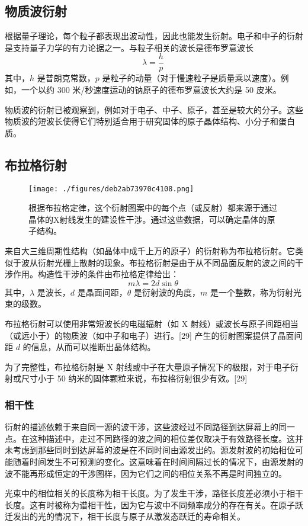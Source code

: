 \subsection{物质波衍射}  
根据量子理论，每个粒子都表现出波动性，因此也能发生衍射。电子和中子的衍射是支持量子力学的有力论据之一。与粒子相关的波长是德布罗意波长  
\[
\lambda = \frac{h}{p}~
\]  
其中，\( h \) 是普朗克常数，\( p \) 是粒子的动量（对于慢速粒子是质量乘以速度）。例如，一个以约 300 米/秒速度运动的钠原子的德布罗意波长大约是 50 皮米。

物质波的衍射已被观察到，例如对于电子、中子、原子，甚至是较大的分子。这些物质波的短波长使得它们特别适合用于研究固体的原子晶体结构、小分子和蛋白质。
\subsection{布拉格衍射}
\begin{figure}[ht]
\centering
\texttt{[image: ./figures/deb2ab73970c4108.png]}
\caption{根据布拉格定律，这个衍射图案中的每个点（或反射）都来源于通过晶体的X射线发生的建设性干涉。通过这些数据，可以确定晶体的原子结构。} \label{fig_YS_24}
\end{figure}
来自大三维周期性结构（如晶体中成千上万的原子）的衍射称为布拉格衍射。它类似于波从衍射光栅上散射的现象。布拉格衍射是由于从不同晶面反射的波之间的干涉作用。构造性干涉的条件由布拉格定律给出：
\[
m\lambda = 2d \sin \theta~
\]
其中，\( \lambda \) 是波长，\( d \) 是晶面间距，\( \theta \) 是衍射波的角度，\( m \) 是一个整数，称为衍射光束的级数。

布拉格衍射可以使用非常短波长的电磁辐射（如 X 射线）或波长与原子间距相当（或远小于）的物质波（如中子和电子）进行。[29] 产生的衍射图案提供了晶面间距 \( d \) 的信息，从而可以推断出晶体结构。

为了完整性，布拉格衍射是 X 射线或中子在大量原子情况下的极限，对于电子衍射或尺寸小于 50 纳米的固体颗粒来说，布拉格衍射很少有效。[29]
\subsubsection{相干性}
衍射的描述依赖于来自同一源的波干涉，这些波经过不同路径到达屏幕上的同一点。在这种描述中，走过不同路径的波之间的相位差仅取决于有效路径长度。这并未考虑到那些同时到达屏幕的波是在不同时间由源发出的。源发射波的初始相位可能随着时间发生不可预测的变化。这意味着在时间间隔过长的情况下，由源发射的波不能再形成恒定的干涉图样，因为它们之间的相位关系不再是时间独立的。

光束中的相位相关的长度称为相干长度。为了发生干涉，路径长度差必须小于相干长度。这有时被称为谱相干性，因为它与波中不同频率成分的存在有关。在原子跃迁发出的光的情况下，相干长度与原子从激发态跃迁的寿命相关。

